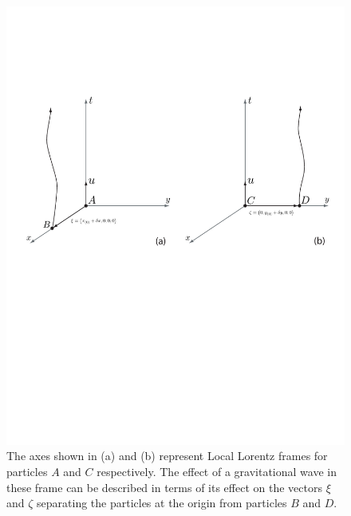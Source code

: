 \newpage

\begin{figure}[p]
\begin{center}
\includegraphics[width=\linewidth]{figures/inspiral/deviation}
\end{center}
\caption[Effect of a Gravitational Wave on Test Particles]{%
\label{f:particles}
The axes shown in (a) and (b) represent Local Lorentz frames for particles $A$
and $C$ respectively. The effect of a gravitational wave in these frame can be
described in terms of its effect on the vectors $\xi$ and $\zeta$ separating
the particles at the origin from particles $B$ and $D$.
}
\end{figure}

